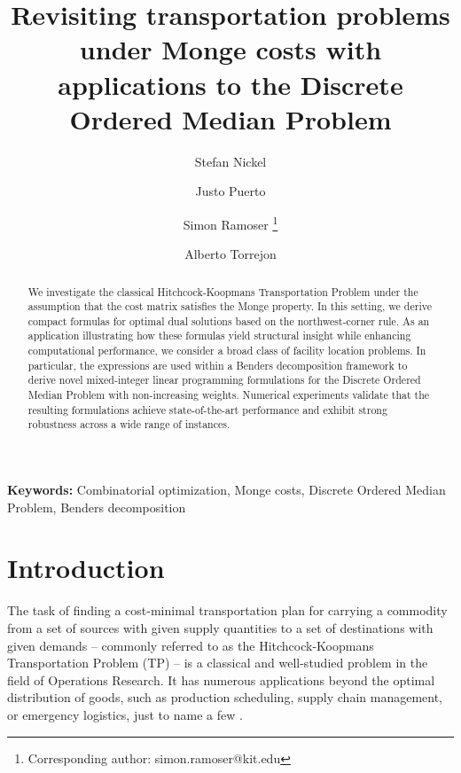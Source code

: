 \documentclass[letterpaper]{article}
\begin{document}
\title{Revisiting transportation problems under Monge costs with applications to the Discrete Ordered Median Problem}

\author[1]{Stefan Nickel }
\author[2,3]{Justo Puerto }
\author[1]{Simon Ramoser \thanks{Corresponding author: simon.ramoser@kit.edu}}
\author[2,3]{Alberto Torrejon }


\date{}

\maketitle

\begin{abstract}
We investigate the classical Hitchcock-Koopmans Transportation Problem under the assumption that the cost matrix satisfies the Monge property. In this setting, we derive compact formulas for optimal dual solutions based on the northwest-corner rule. As an application illustrating how these formulas yield structural insight while enhancing computational performance, we consider a broad class of facility location problems. In particular, the expressions are used within a Benders decomposition framework to derive novel mixed-integer linear programming formulations for the Discrete Ordered Median Problem with non-increasing weights. Numerical experiments validate that the resulting formulations achieve state-of-the-art performance and exhibit strong robustness across a wide range of instances.
\end{abstract}

\vspace{0.5em}
\noindent \textbf{Keywords:} Combinatorial optimization, Monge costs, Discrete Ordered Median Problem, Benders decomposition


\section{Introduction}\label{sec:introduction}
The task of finding a cost-minimal transportation plan for carrying a commodity from a set of sources with given supply quantities to a set of destinations with given demands -- commonly referred to as the Hitchcock-Koopmans Transportation Problem (TP) -- is a classical and well-studied problem in the field of Operations Research. It has numerous applications beyond the optimal distribution of goods, such as production scheduling, supply chain management, or emergency logistics, just to name a few \citep[see, e.g.,][]{zhang_review_2025}.
\end{document}
